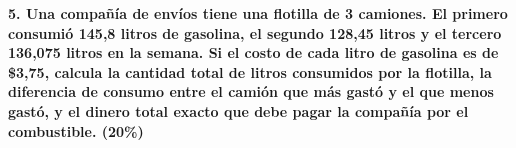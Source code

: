 \documentclass[12pt]{article}
\begin{document}
	\vspace{1cm}
	
	\noindent \textbf{5. Una compañía de envíos tiene una flotilla de 3 camiones. El primero consumió 145,8 litros de gasolina, el segundo 128,45 litros y el tercero 136,075 litros en la semana. Si el costo de cada litro de gasolina es de \$3,75, calcula la cantidad total de litros consumidos por la flotilla, la diferencia de consumo entre el camión que más gastó y el que menos gastó, y el dinero total exacto que debe pagar la compañía por el combustible. (20\%)}
	
\end{document}
